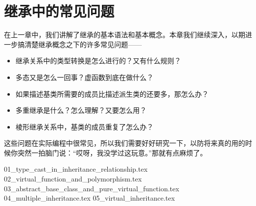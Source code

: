 \chapter{继承中的常见问题}
在上一章中，我们讲解了继承的基本语法和基本概念。本章我们继续深入，以期进一步搞清楚继承概念之下的许多常见问题——
\begin{itemize}
    \item 继承关系中的类型转换是怎么进行的？又有什么规则？\par
    \item 多态又是怎么一回事？虚函数到底在做什么？\par
    \item 如果描述基类所需要的成员比描述派生类的还要多，那怎么办？\par
    \item 多重继承是什么？怎么理解？又要怎么用？\par
    \item 棱形继承关系中，基类的成员重复了怎么办？\par
\end{itemize}
这些问题在实际编程中很常见，所以我们需要好好研究一下，以防将来真的用的时候你突然一拍脑门说：``哎呀，我没学过这玩意。''那就有点麻烦了。\par
{01_type_cast_in_inheritance_relationship.tex}
{02_virtual_function_and_polymorphism.tex}
{03_abstract_base_class_and_pure_virtual_function.tex}
{04_multiple_inheritance.tex}
{05_virtual_inheritance.tex}
